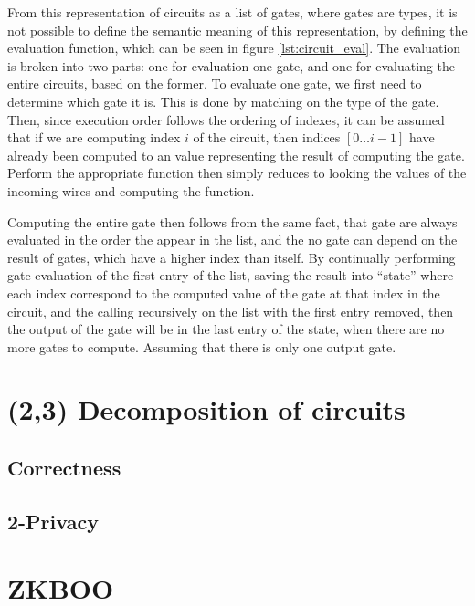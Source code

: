 From this representation of circuits as a list of gates, where gates are types,
it is not possible to define the semantic meaning of this representation, by
defining the evaluation function, which can be seen in figure \ref{lst:circuit_eval}.
The evaluation is broken into two parts: one for evaluation one gate, and one
for evaluating the entire circuits, based on the former.
To evaluate one gate, we first need to determine which gate it is. This is done
by matching on the type of the gate.
Then, since execution order follows the ordering of indexes, it can be assumed
that if we are computing index $i$ of the circuit, then indices $[0 \dots i-1]$
have already been computed to an value representing the result of computing the
gate. Perform the appropriate function then simply reduces to looking the values
of the incoming wires and computing the function.

Computing the entire gate then follows from the same fact, that gate are always
evaluated in the order the appear in the list, and the no gate can depend on
the result of gates, which have a higher index than itself. By continually
performing gate evaluation of the first entry of the list, saving the result
into ``state'' where each index correspond to the computed value of the gate at
that index in the circuit, and the calling recursively on the list with the
first entry removed, then the output of the gate will be in the last entry of
the state, when there are no more gates to compute. Assuming that there is only
one output gate.



\section{(2,3) Decomposition of circuits}
\label{sec:decomposition}



\subsection{Correctness}
\label{sec:decomp_correct}


\subsection{2-Privacy}
\label{sec:decomp_privacy}


\section{ZKBOO}
\label{sec:formal_zkboo}





